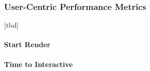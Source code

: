 


\subsubsection{User-Centric Performance Metrics}


[tbd]













\paragraph{Start Render}
















\paragraph{Time to Interactive}




